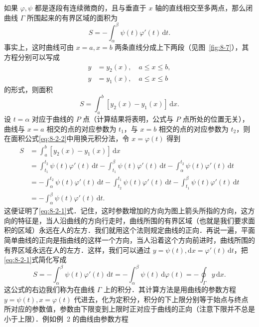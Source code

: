 如果 $\varphi, \psi$ 都是逐段有连续微商的，且与垂直于 $x$ 轴的直线相交至多两点，那么闭曲线 $\Gamma$ 所围起来的有界区域的面积为
\begin{equation}\label{eq:8-2-1}
S = -\int_\alpha^\beta \psi(t)\varphi'(t)\,\mathrm{d}t.
\end{equation}
事实上，这时曲线可由 $x = a, x = b$ 两条直线分成上下两段（见图~\ref{fig:8-7}），其方程分别可以写成
\[
\begin{aligned}
y &= y_2(x), \quad a \leqslant x \leqslant b, \\
y &= y_1(x), \quad a \leqslant x \leqslant b
\end{aligned}
\]
的形式，则面积
\begin{equation}\label{eq:8-2-2}
S = \int_a^b [y_2(x) - y_1(x)]\,\mathrm{d}x.
\end{equation}
设 $t = \alpha$ 对应于曲线的 $P$ 点（计算结果将表明，公式与 $P$ 点所处的位置无关），曲线与 $x = a$ 相交的点的对应参数为 $t_1$，与 $x = b$ 相交的点的对应参数为 $t_2$，则在面积公式\eqref{eq:8-2-2}中用换元积分法，令 $x = \varphi(t)$ 得到
\begin{align*}
S &= \int_a^b [y_2(x) - y_1(x)]\,\mathrm{d}x \\
&= \int_{t_1}^{t_2} \psi(t)\varphi'(t)\,\mathrm{d}t - \int_{t_1}^\beta \psi(t)\varphi'(t)\,\mathrm{d}t - \int_\alpha^{t_2} \psi(t)\varphi'(t)\,\mathrm{d}t \\
&= -\int_\alpha^{t_2} \psi(t)\varphi'(t)\,\mathrm{d}t - \int_{t_2}^{t_1} \psi(t)\varphi'(t)\,\mathrm{d}t - \int_{t_1}^\beta \psi(t)\varphi'(t)\,\mathrm{d}t \\
&= -\int_\alpha^\beta \psi(t)\varphi'(t)\,\mathrm{d}t.
\end{align*}
这便证明了\eqref{eq:8-2-1}式．记住，这时参数增加的方向为图上箭头所指的方向，这方向的特征是，当人沿曲线的方向行走时，曲线所围的有界区域（也就是我们要求面积的区域）永远在人的左方．我们就用这个法则规定曲线的正向．再说一遍，平面简单曲线的正向是指曲线的这样一个方向，当人沿着这个方向前进时，曲线所围的有界区域永远在人的左方．这样，我们可以通过 $y = \psi(t), \mathrm{d}x = \varphi'(t)\,\mathrm{d}t$，把\eqref{eq:8-2-1}式简化写成
\begin{equation}\label{eq:8-2-3}
S = -\int_\alpha^\beta \psi(t)\varphi'(t)\,\mathrm{d}t = -\int_\alpha^\beta \psi(t)\,\mathrm{d}\varphi(t) = -\oint_\Gamma y\,\mathrm{d}x.
\end{equation}
这公式的右边我们称为在曲线 $\Gamma$ 上的积分．其计算方法是用曲线的参数方程 $y = \psi(t), x = \varphi(t)$ 代进去，化为定积分，积分的下上限分别等于始点与终点所对应的参数值，参数由下限变到上限时正对应于曲线的正向（注意下限并不总是小于上限）．例如例~2 的曲线由参数方程
